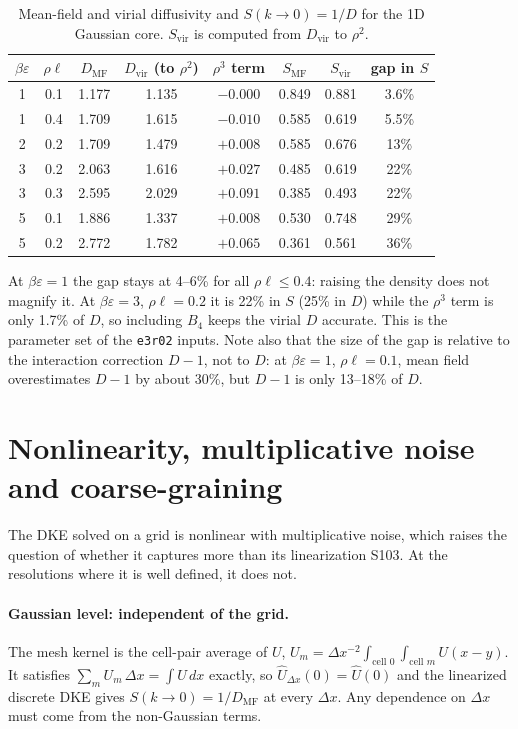 \documentclass[11pt]{article}
\newcommand{\code}[1]{\texttt{#1}}
\newcommand{\Uh}{\hat U}
\newcommand{\MF}{\mathrm{MF}}
\newcommand{\vir}{\mathrm{vir}}
\begin{document}
\begin{table}[h]
\centering
\begin{tabular}{cccccccc}
\toprule
$\beta\varepsilon$ & $\rho\ell$ & $D_\MF$ & $D_\vir$ (to $\rho^2$) & $\rho^3$ term
  & $S_\MF$ & $S_\vir$ & gap in $S$ \\
\midrule
1 & 0.1 & 1.177 & 1.135 & $-0.000$ & 0.849 & 0.881 & 3.6\% \\
1 & 0.4 & 1.709 & 1.615 & $-0.010$ & 0.585 & 0.619 & 5.5\% \\
2 & 0.2 & 1.709 & 1.479 & $+0.008$ & 0.585 & 0.676 & 13\% \\
3 & 0.2 & 2.063 & 1.616 & $+0.027$ & 0.485 & 0.619 & 22\% \\
3 & 0.3 & 2.595 & 2.029 & $+0.091$ & 0.385 & 0.493 & 22\% \\
5 & 0.1 & 1.886 & 1.337 & $+0.008$ & 0.530 & 0.748 & 29\% \\
5 & 0.2 & 2.772 & 1.782 & $+0.065$ & 0.361 & 0.561 & 36\% \\
\bottomrule
\end{tabular}
\caption{Mean-field and virial diffusivity and $S(k\to0)=1/D$ for the 1D
Gaussian core. $S_\vir$ is computed from $D_\vir$ to $\rho^2$.}
\label{tab:gap}
\end{table}

\noindent At $\beta\varepsilon=1$ the gap stays at 4--6\% for all
$\rho\ell\le0.4$: raising the density does not magnify it. At
$\beta\varepsilon=3$, $\rho\ell=0.2$ it is 22\% in $S$ (25\% in $D$) while
the $\rho^3$ term is only 1.7\% of $D$, so including $B_4$ keeps the virial
$D$ accurate. This is the parameter set of the \code{e3r02} inputs. Note also
that the size of the gap is relative to the interaction correction $D-1$, not
to $D$: at $\beta\varepsilon=1$, $\rho\ell=0.1$, mean field overestimates
$D-1$ by about 30\%, but $D-1$ is only 13--18\% of $D$.

\section{Nonlinearity, multiplicative noise and coarse-graining}\label{sec:cg}

The DKE solved on a grid is nonlinear with multiplicative noise, which raises
the question of whether it captures more than its linearization S103. At the
resolutions where it is well defined, it does not.

\paragraph{Gaussian level: independent of the grid.} The mesh kernel is the
cell-pair average of $U$, $U_m = \Delta x^{-2}\int_{\text{cell }0}\int_{\text{cell }m}U(x-y)$.
It satisfies $\sum_m U_m\,\Delta x = \int U\,dx$ exactly, so
$\Uh_{\Delta x}(0)=\Uh(0)$ and the linearized discrete DKE gives
$S(k\to0) = 1/D_\MF$ at every $\Delta x$. Any dependence on $\Delta x$ must come
from the non-Gaussian terms.
\end{document}
